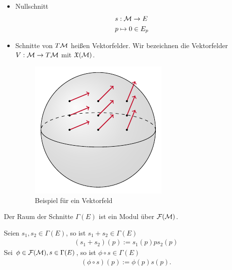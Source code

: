 \begin{bsp}[Schnitte] \leavevmode
\begin{itemize}
\item Nullschnitt
\begin{align}
&s : \mathcal{M} \to E \\
&p \mapsto 0 \in E_p
\end{align}
\item Schnitte von $T\mathcal{M}$ heißen Vektorfelder.
Wir bezeichnen die Vektorfelder $V: \mathcal{M} \to T\mathcal{M}$ mit $\mathfrak{X}(\mathcal{M})$.
\begin{figure}[h]
\centering
\includegraphics[width=0.4\linewidth]{figures/tikz/vectorfield_on_manifold.pdf}
\caption{Beispiel für ein Vektorfeld}
\label{img:bspvektorfeld}
\end{figure} 
\end{itemize}
\end{bsp}
\begin{satz}
\label{satz:SchnitteModul}
Der Raum der Schnitte $\Gamma (E)$ ist ein Modul über $\mathcal{F}(\mathcal{M})$.
\end{satz}
\begin{bew}
Seien $s_1, s_2 \in \Gamma (E)$, so ist $s_1 + s_2 \in \Gamma (E)$
\begin{align}
(s_1 + s_2)(p) := s_1 (p) p s_2 (p)
\end{align}
Sei $\phi \in \mathcal{F}(\mathcal{M}), s\in \Gamma(E)$, so ist $\phi \circ s \in \Gamma (E)$
\begin{align}
(\phi \circ s) (p) := \phi (p) s(p).
\end{align}
\end{bew}

